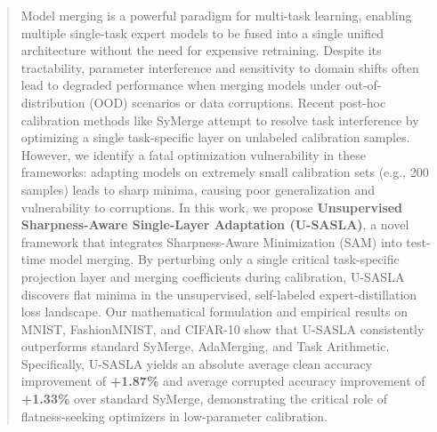 \documentclass{article}
\theoremstyle{plain}
\theoremstyle{definition}
\theoremstyle{remark}
\begin{document}

\printAffiliationsAndNotice{}

\begin{abstract}
Model merging is a powerful paradigm for multi-task learning, enabling multiple single-task expert models to be fused into a single unified architecture without the need for expensive retraining. Despite its tractability, parameter interference and sensitivity to domain shifts often lead to degraded performance when merging models under out-of-distribution (OOD) scenarios or data corruptions. Recent post-hoc calibration methods like SyMerge attempt to resolve task interference by optimizing a single task-specific layer on unlabeled calibration samples. However, we identify a fatal optimization vulnerability in these frameworks: adapting models on extremely small calibration sets (e.g., 200 samples) leads to sharp minima, causing poor generalization and vulnerability to corruptions. In this work, we propose \textbf{Unsupervised Sharpness-Aware Single-Layer Adaptation (U-SASLA)}, a novel framework that integrates Sharpness-Aware Minimization (SAM) into test-time model merging. By perturbing only a single critical task-specific projection layer and merging coefficients during calibration, U-SASLA discovers flat minima in the unsupervised, self-labeled expert-distillation loss landscape. Our mathematical formulation and empirical results on MNIST, FashionMNIST, and CIFAR-10 show that U-SASLA consistently outperforms standard SyMerge, AdaMerging, and Task Arithmetic. Specifically, U-SASLA yields an absolute average clean accuracy improvement of \textbf{+1.87\%} and average corrupted accuracy improvement of \textbf{+1.33\%} over standard SyMerge, demonstrating the critical role of flatness-seeking optimizers in low-parameter calibration.
\end{abstract}
\end{document}
